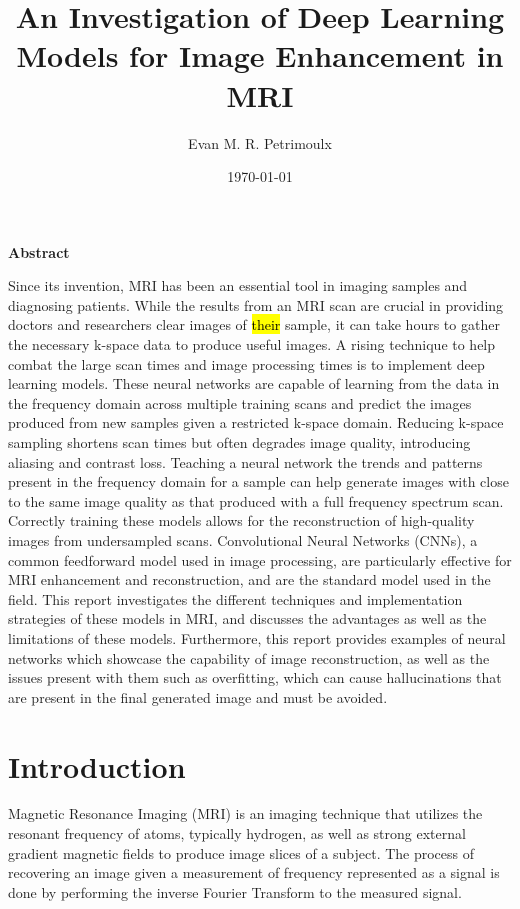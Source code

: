 \documentclass[14pt]{extreport}
\title{An Investigation of Deep Learning Models for Image Enhancement in MRI}
\author{Evan M. R. Petrimoulx}
\date{\today}
\renewenvironment{abstract}{
    \begin{center}
        \bfseries Abstract
    \end{center}
    \vspace{-1em} %
    \itshape
}{}
\begin{document}
    \maketitle
    \setcounter{page}{2}
    \vspace{-2cm}
    \begin{abstract}
        \indent Since its invention, MRI has been an essential tool in imaging samples and diagnosing patients. While the results from an MRI scan are crucial in providing doctors and researchers clear images of \hl{their} sample, it can take hours to gather the necessary k-space data to produce useful images. A rising technique to help combat the large scan times and image processing times is to implement deep learning models. These neural networks are capable of learning from the data in the frequency domain across multiple training scans and predict the images produced from new samples given a restricted k-space domain. Reducing k-space sampling shortens scan times but often degrades image quality, introducing aliasing and contrast loss. Teaching a neural network the trends and patterns present in the frequency domain for a sample can help generate images with close to the same image quality as that produced with a full frequency spectrum scan. Correctly training these models allows for the reconstruction of high-quality images from undersampled scans. Convolutional Neural Networks (CNNs), a common feedforward model used in image processing, are particularly effective for MRI enhancement and reconstruction, and are the standard model used in the field. This report investigates the different techniques and implementation strategies of these models in MRI, and discusses the advantages as well as the limitations of these models. Furthermore, this report provides examples of neural networks which showcase the capability of image reconstruction, as well as the issues present with them such as overfitting, which can cause hallucinations that are present in the final generated image and must be avoided.
    \end{abstract}

    \section*{Introduction}
        \indent Magnetic Resonance Imaging (MRI) is an imaging technique that utilizes the resonant frequency of atoms, typically hydrogen, as well as strong external gradient magnetic fields to produce image slices of a subject. The process of recovering an image given a measurement of frequency represented as a signal is done by performing the inverse Fourier Transform to the measured signal.
\end{document}

